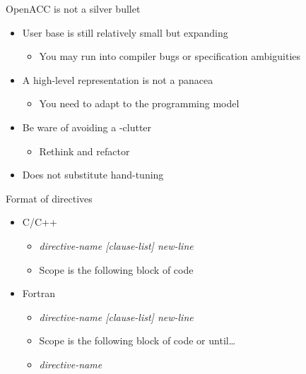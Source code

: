 \documentclass[12pt,aspectratio=169]{beamer}
\begin{document}
\begin{frame}{OpenACC is not a silver bullet}
  \begin{itemize}
  \item User base is still relatively small but expanding
    \begin{itemize}
    \item You may run into compiler bugs or specification ambiguities
    \end{itemize}
  \item A high-level representation is not a panacea
    \begin{itemize}
    \item You need to adapt to the programming model
    \end{itemize}
  \item Be ware of avoiding a -clutter
    \begin{itemize}
    \item Rethink and refactor
    \end{itemize}
  \item Does not substitute hand-tuning
  \end{itemize}
\end{frame}

\begin{frame}[fragile]{Format of directives}
  \begin{itemize}
  \item C/C++
    \begin{itemize}
    \item {} \emph{directive-name [clause-list]
      new-line}
    \item Scope is the following block of code
    \end{itemize}
  \item Fortran
    \begin{itemize}
    \item {} \emph{directive-name [clause-list]
      new-line}
    \item Scope is the following block of code or until\dots
    \item {} \emph{directive-name}
    \end{itemize}
  \end{itemize}
\end{frame}
\end{document}
